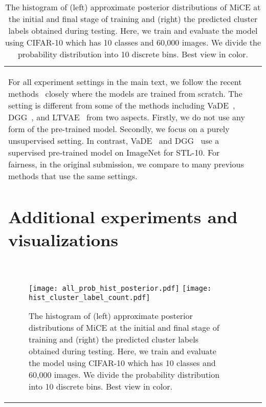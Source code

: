 \documentclass{article} \usepackage{iclr2021_conference,times}
\begin{document}
\begin{table}[t]
\begin{subtable}[h]{0.49\textwidth}
{\begin{tabular}{@{}lc@{}}
For all experiment settings in the main text, we follow the recent methods~\citep{wu2019deep,ji2019invariant,shiran2019multi} closely where the models are trained from scratch. The setting is different from some of the methods including VaDE~\citep{jiang2016variational}, DGG~\citep{yang2019deep}, and LTVAE~\citep{li2019learning} from two aspects. Firstly, we do not use any form of the pre-trained model. Secondly, we focus on a purely unsupervised setting. In contrast, VaDE~\citep{jiang2016variational} and DGG~\citep{yang2019deep} use a supervised pre-trained model on ImageNet for STL-10. For fairness, in the original submission, we compare to many previous methods that use the same settings.  




















































\section{Additional experiments and visualizations}~\label{appendix:additional_exp}



\begin{figure}[]
\begin{center}
\texttt{[image: all\_prob\_hist\_posterior.pdf]}
\texttt{[image: hist\_cluster\_label\_count.pdf]}
\end{center}
\caption{The histogram of (left) approximate posterior distributions of MiCE at the initial and final stage of training and (right) the predicted cluster labels obtained during testing. Here, we train and evaluate the model using CIFAR-10 which has 10 classes and 60,000 images. 
We divide the probability distribution into 10 discrete bins. Best view in color.}
\label{fig:hist}
\end{figure}



\end{tabular}}
\end{subtable}
\end{table}
\end{document}
